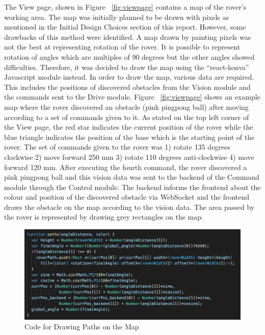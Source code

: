 \documentclass[a4paper]{article}
\begin{document}
The View page, shown in Figure ~\ref{fig:viewpage} contains a map of the rover’s working area. The map was initially planned to be 
drawn with pixels as mentioned in the Initial Design Choices section of this report. However, some drawbacks of this 
method were identified. A map drawn by painting pixels was not the best at representing rotation of the rover. It is 
possible to represent rotation of angles which are multiples of 90 degrees but the other angles showed difficulties. 
Therefore, it was decided to draw the map using the “react-konva” Javascript module instead. \cite{ReactKonva} In order 
to draw the map, various data are required. This includes the positions of discovered obstacles from the Vision module 
and the commands sent to the Drive module. Figure ~\ref{fig:viewpage} shows an example map where the rover discovered an obstacle (pink 
pingpong ball) after moving according to a set of commands given to it. As stated on the top left corner of the View 
page, the red star indicates the current position of the rover while the blue triangle indicates the position of the 
base which is the starting point of the rover. The set of commands given to the rover was 1) rotate 135 degrees clockwise 
2) move forward 250 mm 3) rotate 110 degrees anti-clockwise 4) move forward 120 mm. After executing the fourth command, 
the rover discovered a pink pingpong ball and this vision data was sent to the backend of the Command module through the 
Control module. The backend informs the frontend about the colour and position of the discovered obstacle via WebSocket 
and the frontend draws the obstacle on the map according to the vision data. The area passed by the rover is represented 
by drawing grey rectangles on the map. 

\begin{figure}[H]
	\begin{Center}
		\includegraphics[width = \linewidth]{./images/DrawPaths.png}
		\caption{Code for Drawing Paths on the Map}
        \label{fig:drawpathcode}
	\end{Center}
\end{figure}
\end{document}
